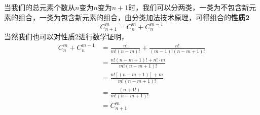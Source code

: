 当我们的总元素个数从$n$变为$n$变为$n+1$时，我们可以分两类，一类为不包含新元素的组合，一类为包含新元素的组合，由分类加法技术原理，可得组合的\textbf{性质2}
\begin{equation}
C_{n + 1}^m = C_n^m + C_n^{m -1}
\end{equation}
当然我们也可以对性质2进行数学证明，
\begin{equation}
\begin{aligned}
C_n^m + C_n^{m - 1} &= \frac{n!}{m!(n-m)!} + \frac{n!}{(m - 1)!(n - m + 1)!}\\
&= \frac{n!(n - m + 1)! + n!\cdot m}{m!(n - m + 1)!}\\
&= \frac{n![(n - m + 1)] + m}{m!(n - m + 1)!}\\
&= \frac{(n + 1!)}{m!(n - m + 1)!}\\
&= C_{n + 1}^m
\end{aligned}
\end{equation}
